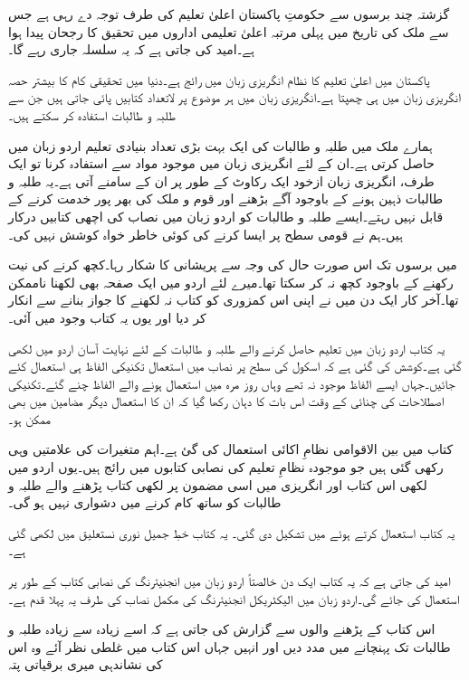 گزشتہ چند برسوں سے حکومتِ پاکستان اعلیٰ تعلیم کی طرف توجہ دے رہی ہے جس سے ملک کی تاریخ میں پہلی مرتبہ اعلیٰ تعلیمی اداروں میں تحقیق کا رجحان پیدا ہوا ہے۔امید کی جاتی ہے کہ یہ سلسلہ جاری رہے گا۔

پاکستان میں اعلیٰ تعلیم کا نظام انگریزی زبان میں رائج ہے۔دنیا میں تحقیقی کام کا بیشتر حصہ انگریزی زبان میں ہی چھپتا ہے۔انگریزی زبان میں ہر موضوع پر لاتعداد کتابیں پائی جاتی ہیں جن سے طلبہ و طالبات استفادہ  کر سکتے ہیں۔

ہمارے ملک میں طلبہ و طالبات کی ایک بہت بڑی تعداد بنیادی تعلیم اردو زبان میں حاصل کرتی ہے۔ان کے لئے انگریزی زبان میں موجود مواد سے استفادہ  کرنا تو ایک طرف، انگریزی زبان ازخود ایک رکاوٹ کے طور پر ان کے سامنے آتی ہے۔یہ طلبہ و طالبات ذہین ہونے کے باوجود آگے بڑھنے اور قوم و ملک کی بھر پور خدمت کرنے کے قابل نہیں رہتے۔ایسے طلبہ و طالبات کو اردو زبان میں نصاب کی اچھی کتابیں درکار ہیں۔ہم نے قومی سطح پر ایسا کرنے کی کوئی خاطر خواہ کوشش نہیں کی۔ 

میں برسوں تک اس صورت حال کی وجہ سے پریشانی کا شکار رہا۔کچھ کرنے کی نیت رکھنے کے باوجود کچھ نہ کر سکتا تھا۔میرے لئے اردو میں ایک صفحہ بھی لکھنا ناممکن تھا۔آخر کار ایک دن میں نے اپنی اس کمزوری کو کتاب نہ لکھنے کا جواز بنانے سے انکار کر دیا اور یوں یہ کتاب وجود میں آئی۔

یہ کتاب اردو زبان میں تعلیم حاصل کرنے والے طلبہ و طالبات کے لئے نہایت آسان اردو میں لکھی گئی ہے۔کوشش کی گئی ہے کہ اسکول کی سطح پر نصاب میں استعمال تکنیکی الفاظ ہی استعمال کئے جائیں۔جہاں ایسے الفاظ موجود نہ تھے وہاں روز مرہ میں استعمال ہونے والے الفاظ چنے گئے۔تکنیکی اصطلاحات کی چنائی کے وقت اس بات کا دہان رکھا گیا کہ ان کا استعمال دیگر مضامین میں بھی ممکن ہو۔

کتاب میں بین الاقوامی نظامِ اکائی استعمال کی گئ ہے۔اہم متغیرات کی علامتیں وہی رکھی گئی ہیں جو موجودہ نظامِ تعلیم کی نصابی کتابوں میں رائج ہیں۔یوں اردو میں لکھی اس کتاب اور انگریزی میں اسی مضمون پر لکھی کتاب پڑھنے والے طلبہ و طالبات کو ساتھ کام کرنے میں دشواری نہیں ہو گی۔ 


یہ کتاب  استعمال کرتے ہوئے  میں تشکیل دی گئی۔ یہ کتاب خطِ جمیل نوری نستعلیق میں لکھی گئی ہے۔

امید کی جاتی ہے کہ یہ کتاب ایک دن خالصتاً اردو زبان میں انجنیئرنگ کی نصابی کتاب کے طور پر استعمال کی جائے گی۔اردو زبان میں الیکٹریکل انجنیئرنگ کی مکمل نصاب کی طرف یہ پہلا قدم ہے۔ 

اس کتاب کے پڑھنے والوں سے گزارش کی جاتی ہے کہ اسے زیادہ سے زیادہ طلبہ و طالبات تک پہنچانے میں مدد دیں اور انہیں جہاں اس کتاب میں غلطی نظر آئے وہ اس کی نشاندہی میری برقیاتی پتہ

